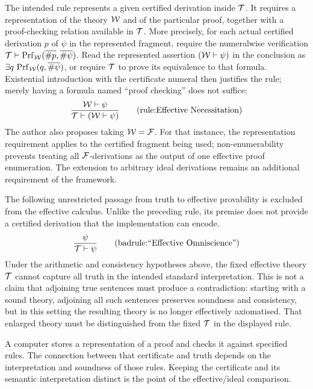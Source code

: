 \begin{inferencerule}
The intended rule represents a given certified derivation inside $\mathcal{T}$.
It requires a representation of the theory ${\mathcal{W}}$ and of the particular
proof, together with a proof-checking relation available in $\mathcal{T}$.
More precisely, for each actual certified derivation $p$ of $\psi$ in the
represented fragment, require the numeralwise verification
$\mathcal{T}\vdash\operatorname{Prf}_{{\mathcal{W}}}(\overline{\#p},
\overline{\#\psi})$. Read the represented assertion
$({\mathcal{W}}\vdash\psi)$ in the conclusion as
$\exists q\,\operatorname{Prf}_{{\mathcal{W}}}(q,\overline{\#\psi})$,
or require $\mathcal{T}$ to prove its equivalence to that formula. Existential
introduction with the certificate numeral then justifies the rule;
merely having a formula named ``proof checking'' does not suffice:
\[
\frac{
\Wau \vdash \psi
}{
\Tau \vdash (\Wau\vdash\psi)
}
\labeltagd{rule}{Effective Necessitation}
\]
The author also proposes taking ${\mathcal{W}}=\mathcal{F}$. For that instance, the
representation requirement applies to the certified fragment being used;
non-enumerability prevents treating all ${\mathcal{F}}$-derivations as the output of
one effective proof enumeration. The extension to arbitrary ideal
derivations remains an additional requirement of the framework.

\label{rule:necessitation}
\end{inferencerule}
\begin{badinferencerule*}%
The following unrestricted passage from truth to effective provability is
excluded from the effective calculus. Unlike the preceding rule, its premise
does not provide a certified derivation that the implementation can encode.
\[
\frac{
\psi
}{
\Tau \vdash \psi
}
\labeltagd{badrule}{``Effective Omniscience''}
\]%
Under the arithmetic and consistency hypotheses above, the fixed effective
theory $\mathcal{T}$ cannot capture all truth in the intended standard
interpretation. This is not a claim that adjoining true sentences must
produce a contradiction: starting with a sound theory, adjoining all such
sentences preserves soundness and consistency, but in this setting the
resulting theory is no longer effectively axiomatised. That enlarged
theory must be distinguished from the fixed $\mathcal{T}$ in the displayed rule.
\end{badinferencerule*}
\begin{note}[philosophical]
A computer stores a representation of a proof and checks it against specified
rules. The connection between that certificate and truth depends on the
interpretation and soundness of those rules. Keeping the certificate and its
semantic interpretation distinct is the point of the effective/ideal
comparison.
\end{note}

